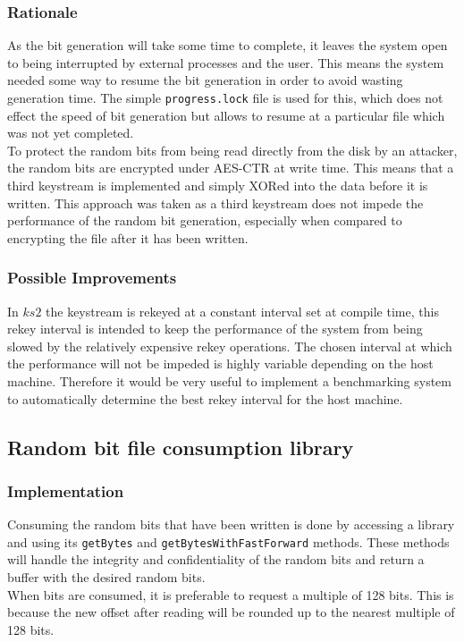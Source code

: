 \documentclass{paper}
\begin{document}
				\subsubsection{Rationale}
					As the bit generation will take some time to complete, it leaves the system open to being interrupted by external processes and the user. This means the system needed some way to resume the bit generation in order to avoid wasting generation time. The simple \texttt{progress.lock} file is used for this, which does not effect the speed of bit generation but allows to resume at a particular file which was not yet completed.\\
					
					To protect the random bits from being read directly from the disk by an attacker, the random bits are encrypted under AES-CTR at write time. This means that a third keystream is implemented and simply XORed into the data before it is written. This approach was taken as a third keystream does not impede the performance of the random bit generation, especially when compared to encrypting the file after it has been written.\\
				\subsubsection{Possible Improvements}
					In $\mathit{ks2}$ the keystream is rekeyed at a constant interval set at compile time, this rekey interval is intended to keep the performance of the system from being slowed by the relatively expensive rekey operations. The chosen interval at which the performance will not be impeded is highly variable depending on the host machine. Therefore it would be very useful to implement a benchmarking system to automatically determine the best rekey interval for the host machine.

			\subsection{Random bit file consumption library}
				\subsubsection{Implementation}
					Consuming the random bits that have been written is done by accessing a library and using its \texttt{getBytes} and \texttt{getBytesWithFastForward} methods. These methods will handle the integrity and confidentiality of the random bits and return a buffer with the desired random bits.\\
					When bits are consumed, it is preferable to request a multiple of 128 bits. This is because the new offset after reading will be rounded up to the nearest multiple of 128 bits.\\
					
\end{document}

